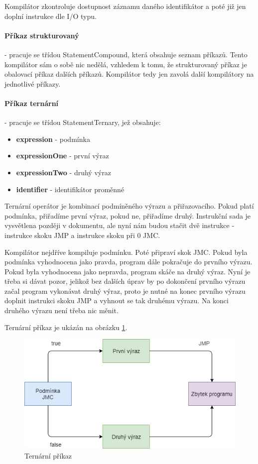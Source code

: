 \documentclass[
12pt,
a4paper,
pdftex,
czech,
titlepage
]{report}
\begin{document}
Kompilátor zkontroluje dostupnost záznamu daného identifikátor a poté již jen doplní instrukce dle I/O typu.

\paragraph{Příkaz strukturovaný} - pracuje se třídou StatementCompound, která obsahuje seznam příkazů. Tento kompilátor sám o sobě nic nedělá, vzhledem k tomu, že strukturovaný příkaz je obalovací příkaz dalších příkazů. Kompilátor tedy jen zavolá další kompilátory na jednotlivé příkazy.

\paragraph{Příkaz ternární} - pracuje se třídou StatementTernary, jež obsahuje:
\begin{itemize}
\item \textbf{expression} - podmínka
\item \textbf{expressionOne} - první výraz
\item \textbf{expressionTwo} - druhý výraz
\item \textbf{identifier} - identifikátor proměnné
\end{itemize}

Ternární operátor je kombinací podmíněného výrazu a přiřazovacího. Pokud platí podmínka, přiřadíme první výraz, pokud ne, přiřadíme druhý. Instrukční sada je vysvětlena později v dokumentu, ale nyní nám budou stačit dvě instrukce - instrukce skoku JMP a instrukce skoku při 0 JMC. 

Kompilátor nejdříve kompiluje podmínku. Poté připraví skok JMC. Pokud byla podmínka vyhodnocena jako pravda, program dále pokračuje do prvního výrazu. Pokud byla vyhodnocena jako nepravda, program skáče na druhý výraz. Nyní je třeba si dávat pozor, jelikož bez dalších úprav by po dokončení prvního výrazu začal program vykonávat druhý výraz, proto je nutné na konec prvního výrazu doplnit instrukci skoku JMP a vyhnout se tak druhému výrazu. Na konci druhého výrazu není třeba nic měnit.

Ternární příkaz je ukázán na obrázku \ref{statementTernary}.

\begin{figure}[h]
\caption{Ternární příkaz}
\label{statementTernary}
\includegraphics[width=\textwidth]{statementTernary.png}
\end{figure}
\end{document}
